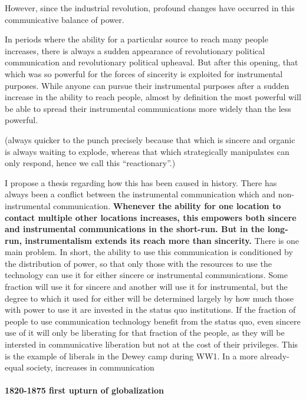 \documentclass[12pt,book]{article}
\begin{document}
However, since the industrial revolution, profound changes have occurred
in this communicative balance of power.

In periods where the ability for a particular source to reach many
people increases, there is always a sudden appearance of revolutionary
political communication and revolutionary political upheaval. But after
this opening, that which was so powerful for the forces of sincerity is
exploited for instrumental purposes. While anyone can pursue their
instrumental purposes after a sudden increase in the ability to reach
people, almost by definition the most powerful will be able to spread
their instrumental communications more widely than the less powerful.

(always quicker to the punch precisely because that which is sincere and
organic is always waiting to explode, whereas that which strategically
manipulates can only respond, hence we call this ``reactionary''.)

I propose a thesis regarding how this has been caused in history. There
has always been a conflict between the instrumental communication which
and non-instrumental communication. \textbf{Whenever the ability for one
location to contact multiple other locations increases, this empowers
both sincere and instrumental communications in the short-run. But in
the long-run, instrumentalism extends its reach more than sincerity.}
There is one main problem. In short, the ability to use this
communication is conditioned by the distribution of power, so that only
those with the resources to use the technology can use it for either
sincere or instrumental communications. Some fraction will use it for
sincere and another will use it for instrumental, but the degree to
which it used for either will be determined largely by how much those
with power to use it are invested in the status quo institutions. If the
fraction of people to use communication technology benefit from the
status quo, even sincere use of it will only be liberating for that
fraction of the people, as they will be intersted in communicative
liberation but not at the cost of their privileges. This is the example
of liberals in the Dewey camp during WW1. In a more already-equal
society, increases in communication

\paragraph{1820-1875 first upturn of
globalization}\label{first-upturn-of-globalization}
\end{document}
